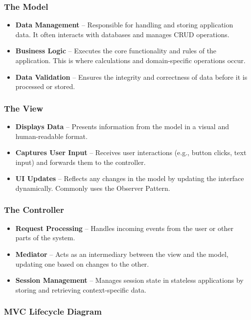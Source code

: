 \documentclass{article}
\begin{document}
\subsubsection*{The Model}
\begin{itemize}
\item \textbf{Data Management} – Responsible for handling and storing application data. It often interacts with databases and manages CRUD operations.
\item \textbf{Business Logic} – Executes the core functionality and rules of the application. This is where calculations and domain-specific operations occur.
\item \textbf{Data Validation} – Ensures the integrity and correctness of data before it is processed or stored.
\end{itemize}

\subsubsection*{The View}
\begin{itemize}
\item \textbf{Displays Data} – Presents information from the model in a visual and human-readable format.
\item \textbf{Captures User Input} – Receives user interactions (e.g., button clicks, text input) and forwards them to the controller.
\item \textbf{UI Updates} – Reflects any changes in the model by updating the interface dynamically. Commonly uses the Observer Pattern.
\end{itemize}

\subsubsection*{The Controller}
\begin{itemize}
\item \textbf{Request Processing} – Handles incoming events from the user or other parts of the system.
\item \textbf{Mediator} – Acts as an intermediary between the view and the model, updating one based on changes to the other.
\item \textbf{Session Management} – Manages session state in stateless applications by storing and retrieving context-specific data.
\end{itemize}

\subsubsection{MVC Lifecycle Diagram}
\end{document}
